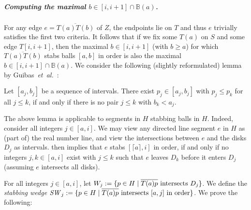 \documentclass[a4paper,UKenglish,cleveref,thm-restate,notab]{lipics-v2021}
\makeatletter
\newcommand{\etal}{\textit{et~al.\@}\xspace}
\newcommand{\B}{\mathbb{B}}
\newcommand{\ceil}[1]{\lceil#1\rceil}
\newcommand{\SW}{\mathit{SW}}
\makeatother
\begin{document}
\subparagraph*{Computing the maximal $b \in [i, i+1] \cap \B(a)$.}
    For any edge $e = \overline{T(a)T(b)}$ of $Z$, the endpoints lie on $T$ and thus $e$ trivially satisfies the first two criteria. 
    It follows that if we fix some $T(a)$ on $S$ and some edge $T[i, i+1]$, then the maximal $b \in [i, i+1]$ (with $b \geq a$) for which $\overline{T(a) T(b)}$ stabs balls $[a, b]$ in order is also the maximal $b \in [i, i+1] \cap \B(a)$. 
    We consider the following (slightly reformulated) lemma by Guibas~\etal~\cite{guibas93minimum_link}:
    
    \begin{lemma}
        \label{lem:ordered_intervals}
        Let $[a_j, b_j]$ be a sequence of intervals. 
        There exist $p_j \in [a_j, b_j]$ with $p_j \leq p_k$ for all $j \leq k$, if and only if there is no pair $j \leq k$ with $b_k < a_j$.
    \end{lemma}
    
    The above lemma is applicable to segments in $H$ stabbing balls in $H$. 
    Indeed, consider all integers $j \in [a, i]$. 
    We may view any directed line segment $e$ in $H$ as (part of) the real number line, and view the intersections between $e$ and the disks $D_j$ as intervals.
     then implies that $e$ stabs $[\ceil{a}, i]$ in order, if and only if no integers $j, k \in [a, i]$ exist with $j \leq k$ such that $e$ leaves $D_k$ before it enters $D_j$ (assuming $e$ intersects all disks).
    
    For all integers $j \in [a, i]$, let $W_j := \{ p \in H \mid \overline{T(a) p} \textnormal{ intersects } D_j \}$. 
    We define the \emph{stabbing wedge} $\SW_j := \{ p \in H \mid \overline{T(a) p} \textnormal{ intersects } [a, j]  \textnormal{ in order} \}$. 
    We prove the following:
    
\end{document}

